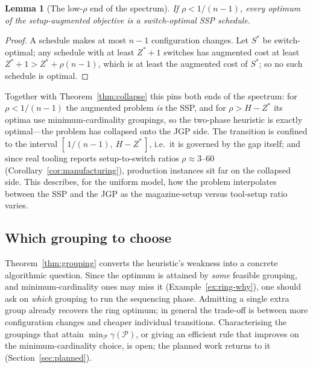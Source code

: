 \documentclass[11pt,a4paper]{article}
\theoremstyle{plain}
\newtheorem{lemma}{Lemma}
\theoremstyle{definition}
\theoremstyle{remark}
\newcommand{\Zst}{Z^{\ast}}
\begin{document}
\begin{lemma}[The low-$\rho$ end of the spectrum]\label{lem:lowrho}
If $\rho<1/(n-1)$, every optimum of the setup-augmented objective is a
switch-optimal SSP schedule.
\end{lemma}
\begin{proof}
A schedule makes at most $n-1$ configuration changes. Let $S^*$ be
switch-optimal; any schedule with at least $\Zst+1$ switches has augmented cost
at least $\Zst+1>\Zst+\rho(n-1)$, which is at least the augmented cost of
$S^*$; so no such schedule is optimal.
\end{proof}
\noindent Together with Theorem~\ref{thm:collapse} this pins both ends of the
spectrum: for $\rho<1/(n-1)$ the augmented problem \emph{is} the SSP, and for
$\rho>H-\Zst$ its optima use minimum-cardinality groupings, so the two-phase
heuristic is exactly optimal---the problem has collapsed onto the JGP side. The
transition is confined to the interval $[\,1/(n-1),\ H-\Zst\,]$, i.e.\ it is
governed by the gap itself; and since real tooling reports setup-to-switch
ratios $\rho\approx3$--$60$ (Corollary~\ref{cor:manufacturing}), production
instances sit far on the collapsed side. This describes, for the uniform model,
how the problem interpolates between the SSP and the JGP as the magazine-setup
versus tool-setup ratio varies.

\subsection{Which grouping to choose}\label{ssec:grouping-sel}
Theorem~\ref{thm:grouping} converts the heuristic's weakness into a concrete
algorithmic question. Since the optimum is attained by \emph{some} feasible
grouping, and minimum-cardinality ones may miss it (Example~\ref{ex:ring-why}), one
should ask on \emph{which} grouping to run the sequencing phase. Admitting a single
extra group already recovers the ring optimum; in general the trade-off is between
more configuration changes and cheaper individual transitions. Characterising the
groupings that attain $\min_{\mathcal{P}}\gamma(\mathcal{P})$, or giving an efficient
rule that improves on the minimum-cardinality choice, is open; the planned work
returns to it (Section~\ref{sec:planned}).

\end{document}
